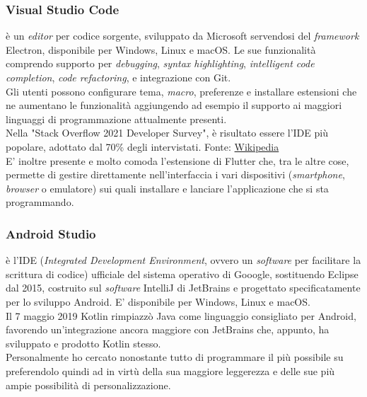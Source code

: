 \subsubsection{Visual Studio Code}
\vsc{} è un \textit{editor} per codice sorgente, sviluppato da Microsoft servendosi del \textit{framework} Electron, disponibile per Windows, Linux e macOS. Le sue funzionalità comprendo supporto per \textit{debugging}, \textit{syntax highlighting}, \textit{intelligent code completion}, \textit{code refactoring}, e integrazione con Git. \\
Gli utenti possono configurare tema, \textit{macro}, preferenze e installare estensioni che ne aumentano le funzionalità aggiungendo ad esempio il supporto ai maggiori linguaggi di programmazione attualmente presenti.\\
Nella "Stack Overflow 2021 Developer Survey", \vsc{} è risultato essere l'IDE più popolare, adottato dal 70\% degli intervistati. {\tiny Fonte: \href{https://en.wikipedia.org/wiki/Visual_Studio_Code}{Wikipedia}}\\
E' inoltre presente e molto comoda l'estensione di Flutter che, tra le altre cose, permette di gestire direttamente nell'interfaccia i vari dispositivi (\textit{smartphone}, \textit{browser} o emulatore) sui quali installare e lanciare l'applicazione che si sta programmando.

\subsubsection{Android Studio}
\astudio{} è l'IDE (\textit{Integrated Development Environment}, ovvero un \textit{software} per facilitare la scrittura di codice) ufficiale del sistema operativo di Gooogle, sostituendo Eclipse dal 2015, costruito sul \textit{software} IntelliJ di JetBrains e progettato specificatamente per lo sviluppo Android. E' disponibile per Windows, Linux e macOS.\\
Il 7 maggio 2019 Kotlin rimpiazzò Java come linguaggio consigliato per Android, favorendo un'integrazione ancora maggiore con JetBrains che, appunto, ha sviluppato e prodotto Kotlin stesso.\\
Personalmente ho cercato nonostante tutto di programmare il più possibile su \vsc{} preferendolo quindi ad \astudio{} in virtù della sua maggiore leggerezza e delle sue più ampie possibilità di personalizzazione.

